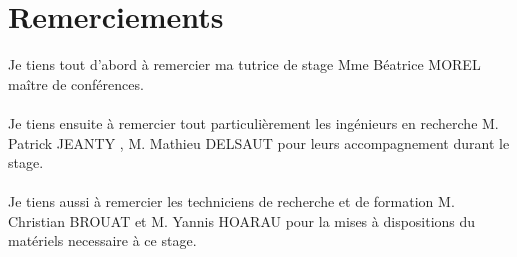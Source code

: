\documentclass[12pt,a4paper]{article}
\begin{document}
\section*{Remerciements}
\sf
Je tiens tout d'abord à remercier ma tutrice de stage Mme Béatrice MOREL maître de conférences.\\
~\\
Je tiens ensuite à remercier tout particulièrement les ingénieurs en recherche M. Patrick JEANTY , M. Mathieu DELSAUT pour leurs accompagnement durant le stage.\\
~\\
Je tiens aussi à remercier les techniciens de recherche et de formation M. Christian BROUAT  et M. Yannis HOARAU pour la mises à dispositions du matériels necessaire à ce stage.
 
 
~


\newpage







\thispagestyle{empty}
\renewcommand{\contentsname}{Sommaire}
\tableofcontents
\newpage

\newpage
\end{document}
